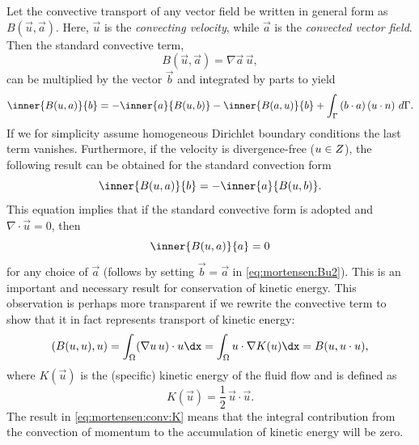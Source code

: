Let the convective transport of any vector field be written in general form as
$B(\vec{u},\vec{a})$. Here, $\vec{u}$ is the \emph{convecting velocity},
while $\vec{a}$ is the \emph{convected vector field}. Then the standard
convective term,
\begin{equation}
B(\vec{u},\vec{a}) =  \nabla \vec{a} \, \vec{u},
\end{equation}
can be multiplied by the vector $\vec{b}$ and integrated by parts to yield
\begin{equation}
 \inner{ B(\vec{u}, \vec{a})}{\vec{b}}
      = -\inner{\vec{a}}{B(\vec{u},\vec{b})}
        - \inner{B (\vec{a}, \vec{u})}{\vec{b} }
        + \int_{\Gamma} \left(\vec{b} \cdot \vec{a} \right)\left(\vec{u} \cdot \vec{n} \right) \, d\Gamma.
\label{eq:mortensen:Bu1}
\end{equation}
If we for simplicity assume homogeneous Dirichlet boundary conditions
the last term vanishes. Furthermore, if the velocity is divergence-free
(${u}\in Z$), the following result can be obtained for the
standard convection form
\begin{equation}
  \inner{ B(\vec{u},\vec{a})}{\vec{b} } = -\inner{ \vec{a}}{ B(\vec{u},\vec{b}) }.
\label{eq:mortensen:Bu2}
\end{equation}
This equation implies that if the standard convective form is adopted
and $\nabla\cdot\vec{u} = 0$, then
\begin{equation}
\inner{ B(\vec{u}, \vec{a})}{ \vec{a} } = 0
\label{eq:mortensen:B0}
\end{equation}
for any choice of $\vec{a}$ (follows by setting $\vec{b}=\vec{a}$ in
\eqref{eq:mortensen:Bu2}). This is an important and necessary result
for conservation of kinetic energy. This observation is perhaps more
transparent if we rewrite the convective term to show that it in fact
represents transport of kinetic energy:
\begin{equation}
\label{eq:mortensen:conv:K}
\left(B(\vec{u}, \vec{u}), \vec{u} \right)
= \int_\Omega (\nabla\vec{u} \, \vec{u})\cdot\vec{u}\dx
= \int_\Omega \vec{u}\cdot\nabla K(\vec{u})\dx
= B(\vec{u}, \vec{u}\cdot\vec{u}),
\end{equation}
where $K(\vec{u})$ is the (specific) kinetic energy of the fluid flow
and is defined as
\begin{equation}
 K(\vec{u})=\frac{1}{2}\, \vec{u}\cdot \vec{u}. \label{eq:mortensen:K}
\end{equation}
The result in \eqref{eq:mortensen:conv:K} means that the integral
contribution from the convection of momentum to the accumulation of
kinetic energy will be zero.

